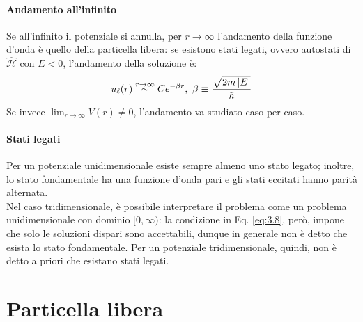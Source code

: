 \paragraph{Andamento all'infinito}

Se all'infinito il potenziale si annulla, per $ r \rightarrow \infty $ l'andamento della funzione d'onda è quello della particella libera: se esistono stati legati, ovvero autostati di $ \hat{\mathcal{H}} $ con $ E < 0 $, l'andamento della soluzione è:
\begin{equation}
	u_{\ell}(r) \overset{r \rightarrow \infty}{\sim} C e^{- \beta r}, \,\, \beta \equiv \frac{\sqrt{2m\left\lvert E\right\rvert}}{\hbar}
	\label{eq:3.11}
\end{equation}
Se invece $ \lim_{r \rightarrow \infty} V(r) \neq 0 $, l'andamento va studiato caso per caso.

\paragraph{Stati legati}

Per un potenziale unidimensionale esiste sempre almeno uno stato legato; inoltre, lo stato fondamentale ha una funzione d'onda pari e gli stati eccitati hanno parità alternata.\\
Nel caso tridimensionale, è possibile interpretare il problema come un problema unidimensionale con dominio $ [0,\infty) $: la condizione in Eq. \ref{eq:3.8}, però, impone che solo le soluzioni dispari sono accettabili, dunque in generale non è detto che esista lo stato fondamentale. Per un potenziale tridimensionale, quindi, non è detto a priori che esistano stati legati.

\section{Particella libera}

